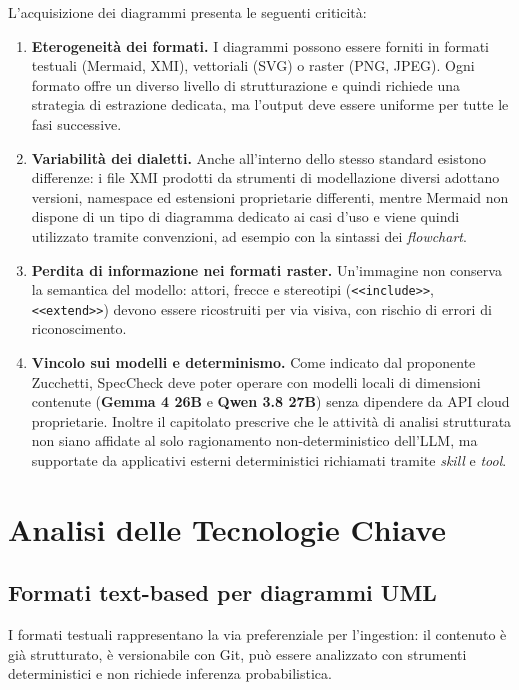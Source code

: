 \documentclass[a4paper, 11pt]{article}
\begin{document}
L'acquisizione dei diagrammi presenta le seguenti criticità:

\begin{enumerate}
    \item \textbf{Eterogeneità dei formati.} I diagrammi possono essere forniti in formati testuali (Mermaid, XMI), vettoriali (SVG) o raster (PNG, JPEG). Ogni formato offre un diverso livello di strutturazione e quindi richiede una strategia di estrazione dedicata, ma l'output deve essere uniforme per tutte le fasi successive.
    \item \textbf{Variabilità dei dialetti.} Anche all'interno dello stesso standard esistono differenze: i file XMI prodotti da strumenti di modellazione diversi adottano versioni, namespace ed estensioni proprietarie differenti, mentre Mermaid non dispone di un tipo di diagramma dedicato ai casi d'uso e viene quindi utilizzato tramite convenzioni, ad esempio con la sintassi dei \textit{flowchart}.
    \item \textbf{Perdita di informazione nei formati raster.} Un'immagine non conserva la semantica del modello: attori, frecce e stereotipi (\texttt{<<include>>}, \texttt{<<extend>>}) devono essere ricostruiti per via visiva, con rischio di errori di riconoscimento.
    \item \textbf{Vincolo sui modelli e determinismo.} Come indicato dal proponente Zucchetti, SpecCheck deve poter operare con modelli locali di dimensioni contenute (\textbf{Gemma 4 26B} e \textbf{Qwen 3.8 27B}) senza dipendere da API cloud proprietarie. Inoltre il capitolato prescrive che le attività di analisi strutturata non siano affidate al solo ragionamento non-deterministico dell'LLM, ma supportate da applicativi esterni deterministici richiamati tramite \textit{skill} e \textit{tool}.
\end{enumerate}

\section{Analisi delle Tecnologie Chiave}

\subsection{Formati text-based per diagrammi UML}
I formati testuali rappresentano la via preferenziale per l'ingestion: il contenuto è già strutturato, è versionabile con Git, può essere analizzato con strumenti deterministici e non richiede inferenza probabilistica.
\end{document}
